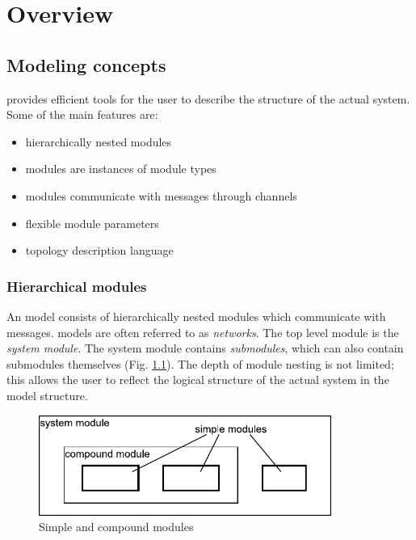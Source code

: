 \chapter{Overview}
\label{cha:overview}


\section{Modeling concepts}

{\opp} provides efficient tools for the user to describe the 
structure of the actual system. Some of the main features are:
\begin{itemize}
\item{hierarchically nested modules}
\item{modules are instances of module types}
\item{modules communicate with messages through channels}
\item{flexible module parameters}
\item{topology description language}
\end{itemize}

\subsection{Hierarchical modules}


An {\opp} model consists of hierarchically nested
modules which communicate with messages.
{\opp} models are often referred to as \textit{networks}. The top
level module is the \textit{system module}.  The system module
contains \textit{submodules}, which can also contain submodules
themselves (Fig. \ref{fig:ch-overview:modules}). The depth of module
nesting is not limited; this allows the user to reflect the logical
structure of the actual system in the model structure.

\begin{figure}[htbp]
\begin{center}
\includegraphics[width=3.772in, height=1.292in]{figures/usmanFig2}
\caption{Simple and compound modules}
\label{fig:ch-overview:modules}
\end{center}
\end{figure}


